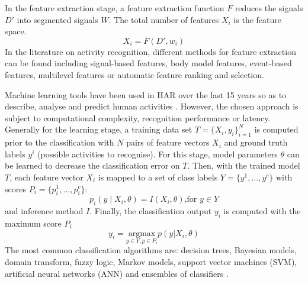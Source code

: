 \documentclass[10pt,journal,compsoc]{IEEEtran}
\begin{document}
In the feature extraction stage, a feature extraction function $F$ reduces
the signals $D'$  into segmented signals $W$.
The total number of features $X_i$ is the feature space.
\begin{equation}
X_i = F ( D', w_i)
\end{equation} 
In the literature on activity recognition, different  methods for feature extraction 
can be found including signal-based features, body model features, event-based features, 
multilevel features or automatic feature ranking and selection.


Machine learning tools have been used in HAR over the last 15 years
so as to describe, analyse and predict human activities \cite{bulling2014}.
However, the chosen approach is subject to computational complexity,
recognition performance or latency.
Generally for the learning stage, a training data set $T = \{ X_i, y_i \}  ^N _ {i=1}$ 
is computed prior to the classification with $N$ pairs of feature vectors $X_i$ and ground 
truth labels $y^i$ (possible activities to recognise). For this stage, model parameters $\theta$ can be learned 
to decrease the classification error on $T$. 
Then, with the trained model $T$,
each feature vector $X_i$  is mapped to a set of class labels 
$Y= \{ y^1, \dots , y^c \}$ with scores $P_i = \{ p^1_i, \dots, p^c_i \}$:
\begin{equation}
p_i ( y \mid X_i, \theta) = I (X_i, \theta) \mbox{,for } y \in Y
\end{equation} 
and inference method $I$.
Finally, the classification output $y_i$ is computed with the maximum score $P_i$
\begin{equation}
y_i  = 
\underset{ y \in Y, p \in P_i }{\text{argmax}}   p(y | X_i, \theta)
\end{equation} 
The most common classification algorithms are: decision trees, Bayesian models, %
domain transform, fuzzy logic, Markov models, support vector machines (SVM), 
artificial neural networks (ANN) and ensembles of classifiers \cite{Lara2013}.




% 
% 
% 
% 
% 
\end{document}
